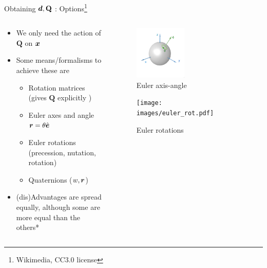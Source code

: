 \documentclass[presentation]{beamer}
\newcommand{\gv}[1]{\ensuremath{\mbox{\boldmath$ #1 $}}}
\newcommand{\bv}[1]{\ensuremath{\mathbf{#1}}}
\begin{document}
\begin{frame}[label={sec:org8c6e1a8}]{Obtaining \(\gv{d}, \bv{Q}\) : Options\footnote{Wikimedia, CC3.0 license}}
\begin{columns}
\begin{column}{0.6\columnwidth}
\begin{itemize}
\item We only need the \alert{action} of \(\bv{Q}\) on \(\gv{x}\)
\item Some means/formalisms to achieve these are
\begin{itemize}
\item Rotation matrices (gives \(\bv{Q}\) explicitly )
\item Euler axes and angle \(\gv{r} = \theta \hat{\gv{e}}\)
\item Euler rotations (precession, nutation, rotation)
\item Quaternions (\(w, \gv{r}\))
\end{itemize}
\item (dis)Advantages are spread equally, although some are more equal than the others*
\end{itemize}
\end{column}
\begin{column}{0.4\columnwidth}
\begin{figure}[htbp]
\centering
\includegraphics[width=0.45\textwidth]{images/euler_aa.png}
\caption{Euler axis-angle}
\end{figure}
\begin{figure}[htbp]
\centering
\texttt{[image: images/euler\_rot.pdf]}
\caption{Euler rotations}
\end{figure}
\end{column}
\end{columns}
\end{frame}
\end{document}
